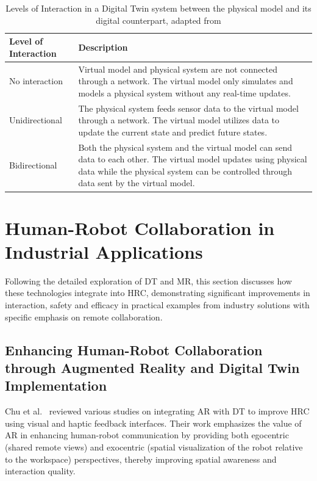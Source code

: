 \begin{table}[!htpb]
    \centering
    \caption{Levels of Interaction in a Digital Twin system between the physical model and its digital counterpart, adapted from \cite{liu2022state}}
    \label{tab:levels_of_control}
    \begin{tabular}{@{}l>{\raggedright\arraybackslash}p{10cm}@{}}
    \toprule
    Level of Interaction & Description \\ 
    \midrule
    No interaction & Virtual model and physical system are not connected through a network. The virtual model only simulates and models a physical 
    system without any real-time updates. \\ \hline
    Unidirectional & The physical system feeds sensor data to the virtual model through a network. The virtual model utilizes data to update the 
    current state and predict future states. \\ \hline
    Bidirectional & Both the physical system and the virtual model can send data to each other. The virtual model updates using physical data while 
    the physical system can be controlled through data sent by the virtual model. \\ 
    \bottomrule
    \end{tabular}
\end{table}


\section{Human-Robot Collaboration in Industrial Applications}
\label{sec:hrc-in-industry}
Following the detailed exploration of \ac{DT} and \ac{MR}, this section discusses how these technologies integrate into \ac{HRC}, demonstrating significant improvements in interaction, safety and efficacy in practical examples from industry solutions with specific emphasis on remote collaboration.

\subsection{Enhancing Human-Robot Collaboration through Augmented Reality and Digital Twin Implementation}
 


Chu et al.~\cite{CHU2023313} reviewed various studies on integrating \ac{AR} with \ac{DT} to improve \ac{HRC} using visual and haptic feedback interfaces. Their work emphasizes the value of \ac{AR} in enhancing human-robot communication by providing both egocentric (shared remote views) and exocentric (spatial visualization of the robot relative to the workspace) perspectives, thereby improving spatial awareness and interaction quality. 

